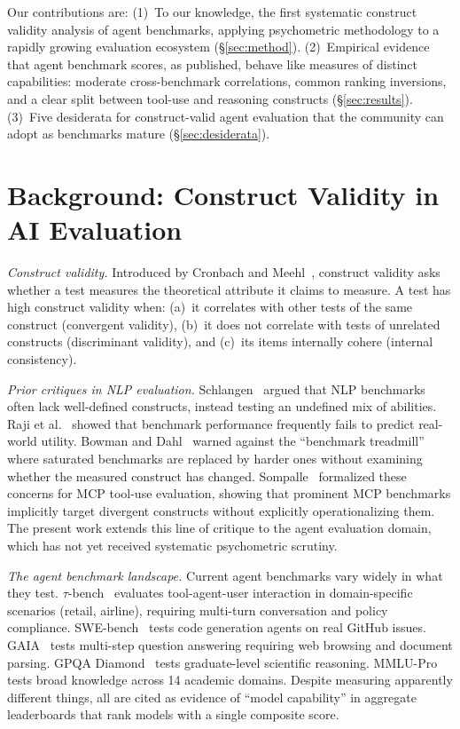 \documentclass[11pt]{article}
\begin{document}
Our contributions are: (1)~To our knowledge, the first systematic construct validity analysis of agent benchmarks, applying psychometric methodology to a rapidly growing evaluation ecosystem (\S\ref{sec:method}). (2)~Empirical evidence that agent benchmark scores, as published, behave like measures of distinct capabilities: moderate cross-benchmark correlations, common ranking inversions, and a clear split between tool-use and reasoning constructs (\S\ref{sec:results}). (3)~Five desiderata for construct-valid agent evaluation that the community can adopt as benchmarks mature (\S\ref{sec:desiderata}).

\section{Background: Construct Validity in AI Evaluation}
\textit{Construct validity.} Introduced by Cronbach and Meehl~\cite{cronbach1955construct}, construct validity asks whether a test measures the theoretical attribute it claims to measure. A test has high construct validity when: (a)~it correlates with other tests of the same construct (convergent validity), (b)~it does not correlate with tests of unrelated constructs (discriminant validity), and (c)~its items internally cohere (internal consistency).

\textit{Prior critiques in NLP evaluation.} Schlangen~\cite{schlangen2021targeting} argued that NLP benchmarks often lack well-defined constructs, instead testing an undefined mix of abilities. Raji et al.~\cite{raji2021ai} showed that benchmark performance frequently fails to predict real-world utility. Bowman and Dahl~\cite{bowman2021what} warned against the ``benchmark treadmill'' where saturated benchmarks are replaced by harder ones without examining whether the measured construct has changed. Sompalle~\cite{evaleval} formalized these concerns for MCP tool-use evaluation, showing that prominent MCP benchmarks implicitly target divergent constructs without explicitly operationalizing them. The present work extends this line of critique to the agent evaluation domain, which has not yet received systematic psychometric scrutiny.

\textit{The agent benchmark landscape.} Current agent benchmarks vary widely in what they test. $\tau$-bench~\cite{yao2024taubench} evaluates tool-agent-user interaction in domain-specific scenarios (retail, airline), requiring multi-turn conversation and policy compliance. SWE-bench~\cite{jimenez2024swebench} tests code generation agents on real GitHub issues. GAIA~\cite{mialon2024gaia} tests multi-step question answering requiring web browsing and document parsing. GPQA Diamond~\cite{rein2024gpqa} tests graduate-level scientific reasoning. MMLU-Pro~\cite{wang2024mmlupro} tests broad knowledge across 14 academic domains. Despite measuring apparently different things, all are cited as evidence of ``model capability'' in aggregate leaderboards that rank models with a single composite score.
\end{document}
